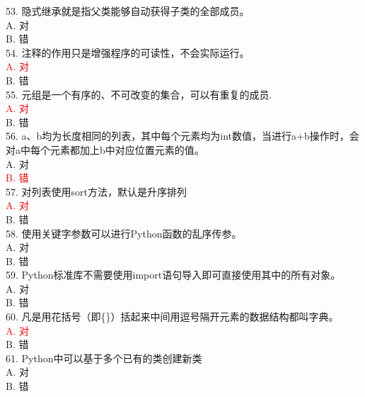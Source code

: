 \documentclass[6pt]{article}
\begin{document}
53. 隐式继承就是指父类能够自动获得子类的全部成员。\\

A. 对\\
B. 错\\

54. 注释的作用只是增强程序的可读性，不会实际运行。\\

\textcolor{red}{A. 对}\\
B. 错\\

55. 元组是一个有序的、不可改变的集合，可以有重复的成员.\\

\textcolor{red}{A. 对}\\
B. 错\\

56. a、b均为长度相同的列表，其中每个元素均为int数值，当进行a+b操作时，会对a中每个元素都加上b中对应位置元素的值。\\

A. 对\\
\textcolor{red}{B. 错}\\

57. 对列表使用sort方法，默认是升序排列\\

\textcolor{red}{A. 对}\\
B. 错\\

58. 使用关键字参数可以进行Python函数的乱序传参。\\

A. 对\\
B. 错\\

59. Python标准库不需要使用import语句导入即可直接使用其中的所有对象。\\

A. 对\\
B. 错\\

60. 凡是用花括号（即\{\}）括起来中间用逗号隔开元素的数据结构都叫字典。\\

\textcolor{red}{A. 对}\\
B. 错\\

61. Python中可以基于多个已有的类创建新类\\

A. 对\\
B. 错\\
\end{document}
